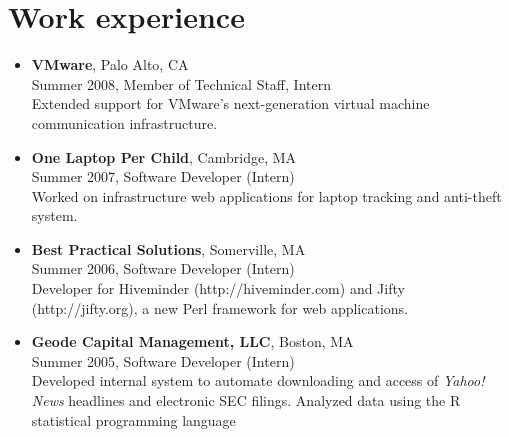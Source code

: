 \documentclass[letterpaper,10pt]{article}
\begin{document}
\section*{Work experience}
\vspace*{-0.2cm}
\begin{itemize}
  \item\textbf{VMware}, Palo Alto, CA \\
    Summer 2008, Member of Technical Staff, Intern \\
    Extended support for VMware's next-generation virtual machine
    communication infrastructure.
  \item\textbf{One Laptop Per Child}, Cambridge, MA \\
    Summer 2007, Software Developer (Intern) \\
    Worked on infrastructure web applications for laptop tracking and
    anti-theft system.
  \item \textbf{Best Practical Solutions}, Somerville, MA \\
    Summer 2006, Software Developer (Intern) \\
    Developer for Hiveminder (http://hiveminder.com) and Jifty
    (http://jifty.org), a new Perl framework for web applications.
          
  \item \textbf{Geode Capital Management, LLC}, Boston, MA \\
  Summer 2005, Software Developer (Intern) \\
  Developed internal system to automate downloading and access of {\em
    Yahoo! \textregistered News} headlines and electronic SEC
  filings. Analyzed data using the R statistical programming language
\end{itemize}
\end{document}
